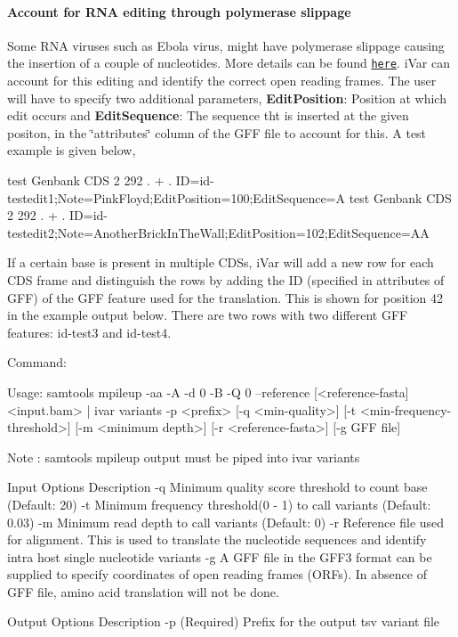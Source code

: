 \paragraph*{Account for R\+NA editing through polymerase slippage}

Some R\+NA viruses such as Ebola virus, might have polymerase slippage causing the insertion of a couple of nucleotides. More details can be found \href{https://viralzone.expasy.org/857?outline=all_by_protein}{\tt here}. i\+Var can account for this editing and identify the correct open reading frames. The user will have to specify two additional parameters, {\bfseries Edit\+Position}\+: Position at which edit occurs and {\bfseries Edit\+Sequence}\+: The sequence tht is inserted at the given positon, in the \char`\"{}attributes\char`\"{} column of the G\+FF file to account for this. A test example is given below,


\begin{DoxyCode}
test    Genbank CDS 2   292 .   +   .   ID=id-testedit1;Note=PinkFloyd;EditPosition=100;EditSequence=A
test    Genbank CDS 2   292 .   +   .  
       ID=id-testedit2;Note=AnotherBrickInTheWall;EditPosition=102;EditSequence=AA
\end{DoxyCode}


If a certain base is present in multiple C\+D\+Ss, i\+Var will add a new row for each C\+DS frame and distinguish the rows by adding the ID (specified in attributes of G\+FF) of the G\+FF feature used for the translation. This is shown for position 42 in the example output below. There are two rows with two different G\+FF features\+: id-\/test3 and id-\/test4.

Command\+: 
\begin{DoxyCode}
Usage: samtools mpileup -aa -A -d 0 -B -Q 0 --reference [<reference-fasta] <input.bam> | ivar variants -p
       <prefix> [-q <min-quality>] [-t <min-frequency-threshold>] [-m <minimum depth>] [-r <reference-fasta>] [-g
       GFF file]

Note : samtools mpileup output must be piped into ivar variants

Input Options    Description
           -q    Minimum quality score threshold to count base (Default: 20)
           -t    Minimum frequency threshold(0 - 1) to call variants (Default: 0.03)
           -m    Minimum read depth to call variants (Default: 0)
           -r    Reference file used for alignment. This is used to translate the nucleotide sequences and
       identify intra host single nucleotide variants
           -g    A GFF file in the GFF3 format can be supplied to specify coordinates of open reading
       frames (ORFs). In absence of GFF file, amino acid translation will not be done.

Output Options   Description
           -p    (Required) Prefix for the output tsv variant file
\end{DoxyCode}


